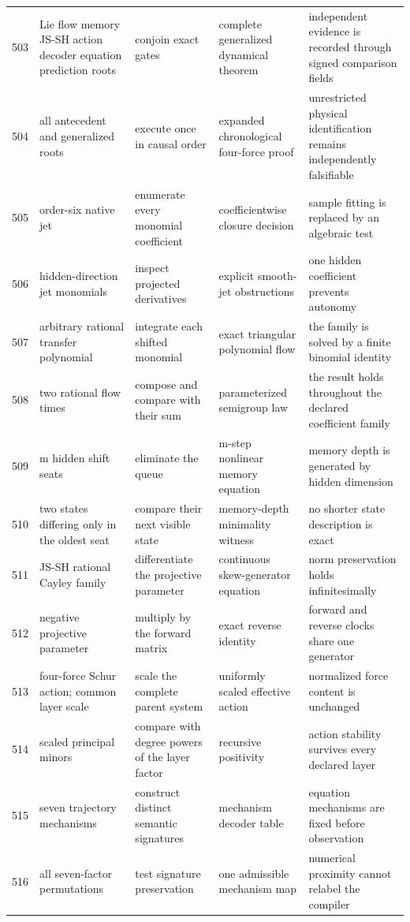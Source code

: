 \documentclass[11pt]{article}
\numberwithin{equation}{section}
\theoremstyle{remark}
\begin{document}
\begin{landscape}
\begin{longtable}{p{0.65cm}p{3.5cm}p{4.0cm}p{4.0cm}p{4.6cm}}
503&Lie flow memory JS-SH action decoder equation prediction roots&conjoin exact gates&complete generalized dynamical theorem&independent evidence is recorded through signed comparison fields\\
504&all antecedent and generalized roots&execute once in causal order&expanded chronological four-force proof&unrestricted physical identification remains independently falsifiable\\
505&order-six native jet&enumerate every monomial coefficient&coefficientwise closure decision&sample fitting is replaced by an algebraic test\\
506&hidden-direction jet monomials&inspect projected derivatives&explicit smooth-jet obstructions&one hidden coefficient prevents autonomy\\
507&arbitrary rational transfer polynomial&integrate each shifted monomial&exact triangular polynomial flow&the family is solved by a finite binomial identity\\
508&two rational flow times&compose and compare with their sum&parameterized semigroup law&the result holds throughout the declared coefficient family\\
509&m hidden shift seats&eliminate the queue&m-step nonlinear memory equation&memory depth is generated by hidden dimension\\
510&two states differing only in the oldest seat&compare their next visible state&memory-depth minimality witness&no shorter state description is exact\\
511&JS-SH rational Cayley family&differentiate the projective parameter&continuous skew-generator equation&norm preservation holds infinitesimally\\
512&negative projective parameter&multiply by the forward matrix&exact reverse identity&forward and reverse clocks share one generator\\
513&four-force Schur action; common layer scale&scale the complete parent system&uniformly scaled effective action&normalized force content is unchanged\\
514&scaled principal minors&compare with degree powers of the layer factor&recursive positivity&action stability survives every declared layer\\
515&seven trajectory mechanisms&construct distinct semantic signatures&mechanism decoder table&equation mechanisms are fixed before observation\\
516&all seven-factor permutations&test signature preservation&one admissible mechanism map&numerical proximity cannot relabel the compiler\\

\end{longtable}
\end{landscape}
\end{document}
